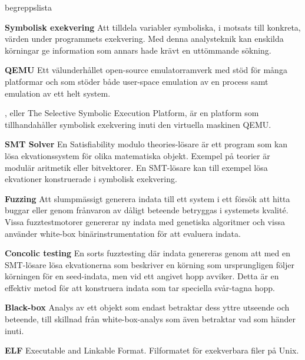 \begin{labeling}{begreppslista}

  \item [\textbf{Symbolisk exekvering}] Att tilldela variabler symboliska, i
      motsats till konkreta, värden under programmets exekvering. Med denna
      analysteknik kan enskilda körningar ge information som annars hade krävt
      en uttömmande sökning.

  \item [\textbf{QEMU}] Ett välunderhållet open-source emulatorramverk med stöd
    för många platformar och som stöder både user-space emulation av en process
    samt emulation av ett helt system.

  \item [\textbf{\stoe}] \stoe, eller The Selective Symbolic Execution Platform, är
      en platform som tillhandahåller symbolisk exekvering inuti den virtuella
      maskinen QEMU.

  \item [\textbf{SMT Solver}] En Satisfiability modulo theories-lösare är ett
      program som kan lösa ekvationssystem för olika matematiska objekt. Exempel
      på teorier är modulär aritmetik eller bitvektorer. En SMT-lösare kan till
      exempel lösa ekvationer konstruerade i symbolisk exekvering.

  \item [\textbf{Fuzzing}] Att slumpmässigt generera indata till ett system i
      ett försök att hitta buggar eller genom frånvaron av dåligt beteende
      betryggas i systemets kvalité. Vissa fuzztestmotorer genererar ny indata
      med genetiska algoritmer och vissa använder white-box binärinstrumentation
      för att evaluera indata.

  \item [\textbf{Concolic testing}] En sorts fuzztesting där indata genereras
      genom att med en SMT-lösare lösa ekvationerna som beskriver en körning som
      ursprungligen följer körningen för en seed-indata, men vid ett angivet
      hopp avviker. Detta är en effektiv metod för att konstruera indata som tar
      speciella svår-tagna hopp.

  \item [\textbf{Black-box}] Analys av ett objekt som endast betraktar dess
      yttre utseende och beteende, till skillnad från white-box-analys som även
      betraktar vad som händer inuti.

  \item [\textbf{ELF}] Executable and Linkable Format. Filformatet för
      exekverbara filer på Unix.

\end{labeling}
